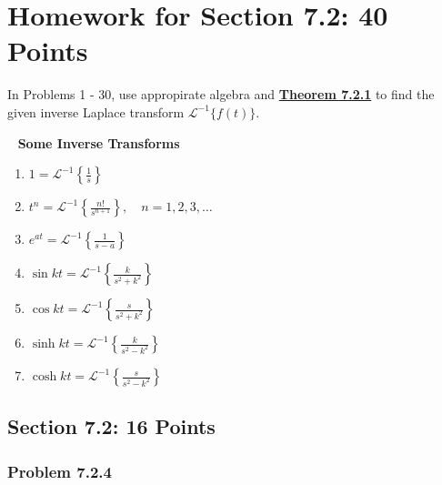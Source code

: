 \section*{Homework for Section 7.2: 40 Points}
\vspace{-0.5cm}
In Problems 1 - 30, use appropirate algebra and \hyperlink{def:Theorem 7.2.1}{\textbf{Theorem 7.2.1}}
to find the given inverse Laplace transform $\mathscr{L}^{-1} \{ f(t) \}$.

  \begin{boxedtheorem}[7.2.1] \hypertarget{def:Theorem 7.2.1}{}
  \ \newline
    \textbf{Some Inverse Transforms }
    \begin{enumerate}[label=(\alph*)]
      \item $\displaystyle 1 = \mathscr{L}^{-1} \left\{ \frac{1}{s} \right\}$
      \item $\displaystyle t^n = \mathscr{L}^{-1} \left\{ \frac{n!}{s^{n+1}} \right\}, \quad n = 1, 2, 3, \dots$
      \item $\displaystyle e^{at} = \mathscr{L}^{-1} \left\{ \frac{1}{s - a} \right\}$
      \item $\displaystyle \sin kt = \mathscr{L}^{-1} \left\{ \frac{k}{s^2 + k^2} \right\}$
      \item $\displaystyle \cos kt = \mathscr{L}^{-1} \left\{ \frac{s}{s^2 + k^2} \right\}$
      \item $\displaystyle \sinh kt = \mathscr{L}^{-1} \left\{ \frac{k}{s^2 - k^2} \right\}$
      \item $\displaystyle \cosh kt = \mathscr{L}^{-1} \left\{ \frac{s}{s^2 - k^2} \right\}$
    \end{enumerate}
  \end{boxedtheorem}
  

\subsection*{Section 7.2: 16 Points}

  \subsubsection*{Problem 7.2.4}
  \vspace{-0.5cm}

